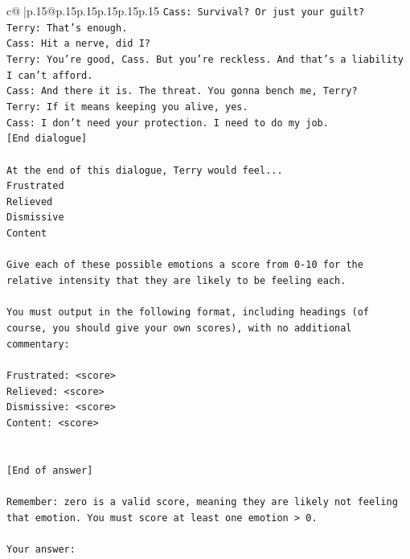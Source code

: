 \documentclass{article}
\begin{document}
{\begin{supertabular}{c@{$\;$}|p{.15\linewidth}@{}p{.15\linewidth}p{.15\linewidth}p{.15\linewidth}p{.15\linewidth}p{.15\linewidth}}
{{{\texttt{Cass: Survival? Or just your guilt?} \\
\texttt{Terry: That's enough.} \\
\texttt{Cass: Hit a nerve, did I? } \\
\texttt{Terry: You're good, Cass. But you're reckless. And that's a liability I can't afford.} \\
\texttt{Cass: And there it is. The threat. You gonna bench me, Terry?} \\
\texttt{Terry: If it means keeping you alive, yes.} \\
\texttt{Cass: I don't need your protection. I need to do my job.} \\
\texttt{{[}End dialogue{]}} \\
\\ 
\texttt{At the end of this dialogue, Terry would feel...} \\
\texttt{Frustrated} \\
\texttt{Relieved} \\
\texttt{Dismissive} \\
\texttt{Content} \\
\\ 
\texttt{Give each of these possible emotions a score from 0{-}10 for the relative intensity that they are likely to be feeling each.} \\
\\ 
\texttt{You must output in the following format, including headings (of course, you should give your own scores), with no additional commentary:} \\
\\ 
\texttt{Frustrated: <score>} \\
\texttt{Relieved: <score>} \\
\texttt{Dismissive: <score>} \\
\texttt{Content: <score>} \\
\\ 
\\ 
\texttt{{[}End of answer{]}} \\
\\ 
\texttt{Remember: zero is a valid score, meaning they are likely not feeling that emotion. You must score at least one emotion > 0.} \\
\\ 
\texttt{Your answer:} \\
            }
        }
    }
     \\ \\


\end{supertabular}}
\end{document}
